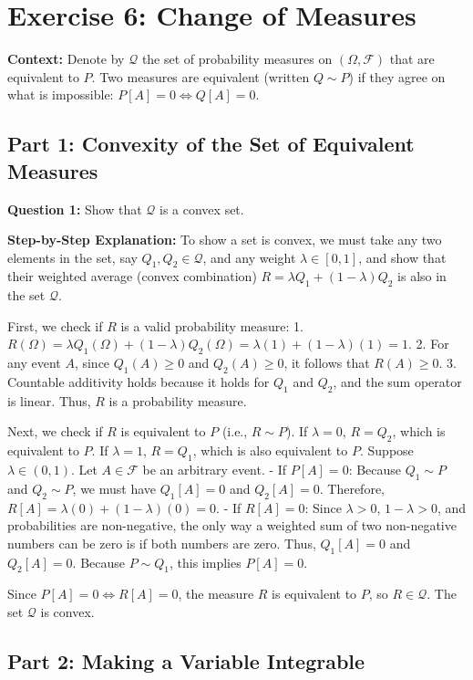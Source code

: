 \section{Exercise 6: Change of Measures}

\textbf{Context:} Denote by $\mathcal{Q}$ the set of probability measures on $(\Omega, \mathcal{F})$ that are equivalent to $P$. Two measures are equivalent (written $Q \sim P$) if they agree on what is impossible: $P[A] = 0 \iff Q[A] = 0$.

\subsection{Part 1: Convexity of the Set of Equivalent Measures}

\textbf{Question 1:} Show that $\mathcal{Q}$ is a convex set.

\textbf{Step-by-Step Explanation:}
To show a set is convex, we must take any two elements in the set, say $Q_1, Q_2 \in \mathcal{Q}$, and any weight $\lambda \in [0, 1]$, and show that their weighted average (convex combination) $R = \lambda Q_1 + (1 - \lambda)Q_2$ is also in the set $\mathcal{Q}$.

First, we check if $R$ is a valid probability measure:
1. $R(\Omega) = \lambda Q_1(\Omega) + (1 - \lambda)Q_2(\Omega) = \lambda(1) + (1 - \lambda)(1) = 1$.
2. For any event $A$, since $Q_1(A) \ge 0$ and $Q_2(A) \ge 0$, it follows that $R(A) \ge 0$.
3. Countable additivity holds because it holds for $Q_1$ and $Q_2$, and the sum operator is linear.
Thus, $R$ is a probability measure.

Next, we check if $R$ is equivalent to $P$ (i.e., $R \sim P$).
If $\lambda = 0$, $R = Q_2$, which is equivalent to $P$. If $\lambda = 1$, $R = Q_1$, which is also equivalent to $P$. 
Suppose $\lambda \in (0, 1)$. Let $A \in \mathcal{F}$ be an arbitrary event.
- If $P[A] = 0$: Because $Q_1 \sim P$ and $Q_2 \sim P$, we must have $Q_1[A] = 0$ and $Q_2[A] = 0$. Therefore, $R[A] = \lambda(0) + (1-\lambda)(0) = 0$.
- If $R[A] = 0$: Since $\lambda > 0$, $1-\lambda > 0$, and probabilities are non-negative, the only way a weighted sum of two non-negative numbers can be zero is if both numbers are zero. Thus, $Q_1[A] = 0$ and $Q_2[A] = 0$. Because $P \sim Q_1$, this implies $P[A] = 0$.

Since $P[A] = 0 \iff R[A] = 0$, the measure $R$ is equivalent to $P$, so $R \in \mathcal{Q}$. The set $\mathcal{Q}$ is convex.

\subsection{Part 2: Making a Variable Integrable}

